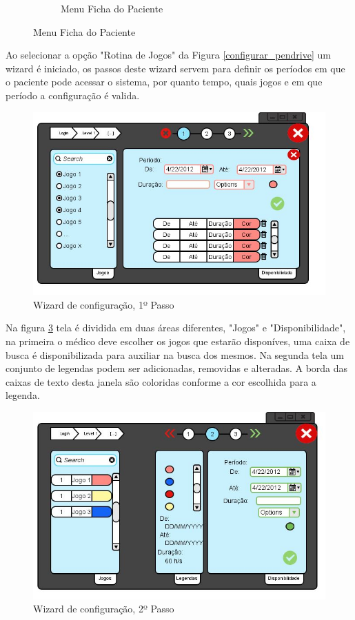 \documentclass[12pt]{article}
\begin{document}
\begin{figure}[h]
\begin{subfigure}{0.5\textwidth}
\caption{Menu Ficha do Paciente}
\label{ficha_do_paciente}
\end{subfigure}
\end{figure}

Ao selecionar a opção "Rotina de Jogos" da Figura \ref{configurar_pendrive} um wizard é iniciado, os passos deste wizard servem para definir os períodos em que o paciente pode acessar o sistema, por quanto tempo, quais jogos e em que período a configuração é valida.
\newpage
\begin{figure}[h]
\centering
\includegraphics[scale=0.6]{imagens/2-4-1-1Configurar_Pendrive_Rotina_1.jpg}
\caption{Wizard de configuração, 1º Passo}
\label{wizard1}
\end{figure}

Na figura \ref{wizard1} tela é dividida em duas áreas diferentes, "Jogos" e "Disponibilidade", na primeira o médico deve escolher os jogos que estarão disponíves, uma caixa de busca é disponibilizada para auxiliar na busca dos mesmos. Na segunda tela um conjunto de legendas podem ser adicionadas, removidas e alteradas. A borda das caixas de texto desta janela são coloridas conforme a cor escolhida para a legenda.

\begin{figure}[h!]
\centering
\includegraphics[scale=0.6]{imagens/2-4-1-2Configurar_Pendrive_Rotina_2.jpg}
\caption{Wizard de configuração, 2º Passo}
\label{wizard2}
\end{figure}
\end{document}
